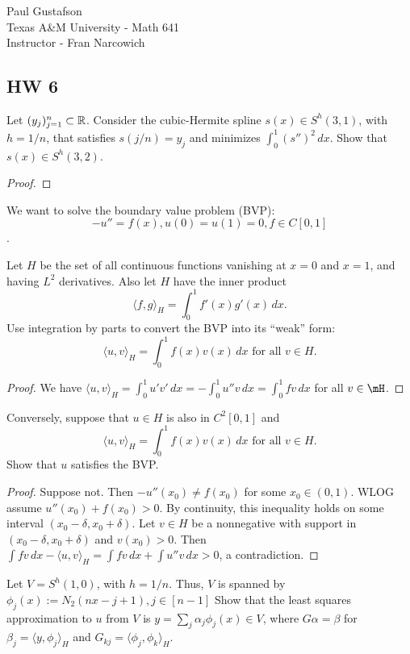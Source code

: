 \documentclass{article}
\begin{document}
\noindent Paul Gustafson\\
\noindent Texas A\&M University - Math 641\\ 
\noindent Instructor - Fran Narcowich

\subsection*{HW 6}
 Let $(y_j)_{j=1}^n \subset \mathbb{R}$. Consider the cubic-Hermite spline $s(x) \in S^h(3,1)$, with $h = 1/n$, that satisfies $s(j/n) = y_j$ and minimizes $\int_0^1 (s'')^2 \, dx$. Show that $s(x) \in S^h(3,2)$.
\begin{proof}

\end{proof}

 We want to solve the boundary value problem (BVP): 
$$-u'' = f(x), u(0) = u(1) = 0, f \in C[0,1]$$.

 Let $H$ be the set of all continuous functions vanishing at $x = 0$ and $x = 1$, and having $L^2$ derivatives. Also let $H$ have the inner product
$$\langle f, g \rangle_H = \int_0^1 f'(x) g'(x) \, dx.$$
Use integration by parts to convert the BVP into its ``weak'' form:
$$\langle u, v \rangle_H = \int_0^1 f(x) v(x) \, dx \text{ for all } v \in H.$$
\begin{proof}
We have $\langle u, v \rangle_H = \int_0^1 u' v' \, dx =  - \int_0^1 u'' v \, dx = \int_0^1 f v \, dx$ for all $v \in \mH$.
\end{proof}

 Conversely, suppose that $u \in H$ is also in $C^2[0,1]$ and 
$$\langle u, v \rangle_H  = \int_0^1 f(x) v(x) \, dx \text{ for all } v \in H.$$
Show that $u$ satisfies the BVP.
\begin{proof}
Suppose not. Then $-u''(x_0) \neq f(x_0)$ for some $x_0 \in (0,1)$. WLOG assume $u''(x_0) + f(x_0) > 0$.  By continuity, this inequality holds on some interval $(x_0 - \delta, x_0 + \delta)$. Let $v \in H$ be a nonnegative with support in $(x_0 - \delta, x_0 + \delta)$ and $v(x_0) > 0$.  Then $\int f v \, dx - \langle u, v \rangle_H = \int f v \, dx + \int u'' v \, dx  > 0$, a contradiction.
\end{proof}


 Let $V = S^h(1,0)$, with $h = 1/n$. Thus, $V$ is spanned by $\phi_j(x) := N_2(nx - j+1), j \in [n-1]$ Show that the least squares approximation to $u$ from $V$ is $y = \sum_j \alpha_j \phi_j(x) \in V$, where $G \alpha = \beta$ for $\beta_j = \langle y , \phi_j \rangle_H$ and $G_{kj} = \langle \phi_j, \phi_k \rangle_H$.
\end{document}
